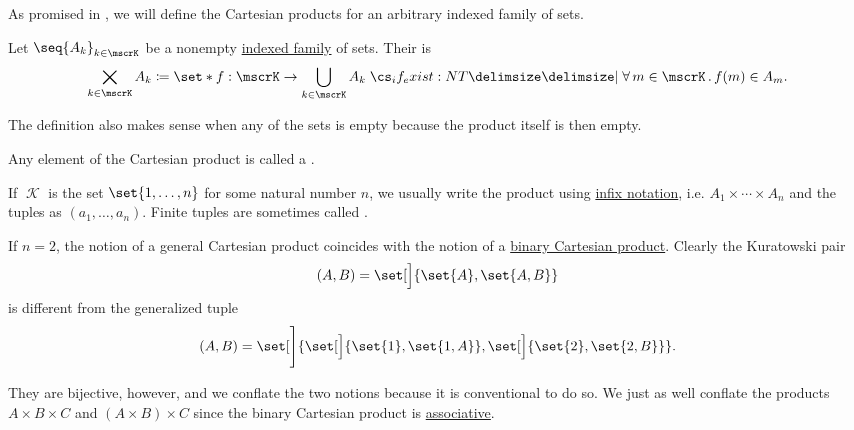 \begin{definition}\label{def:cartesian_product}
  As promised in , we will define the Cartesian products for an arbitrary indexed family of sets.

  Let \( \seq{ A_k }_{k \in \mscrK} \) be a nonempty \hyperref[def:indexed_family]{indexed family} of sets. Their  is
  \begin{equation}\label{eq:def:cartesian_product}
    \bigtimes_{k \in \mscrK} A_k \coloneqq \set*{ f: \mscrK \to \bigcup_{k \in \mscrK} A_k \given* \qforall{m \in \mscrK} f(m) \in A_m }.
  \end{equation}

  The definition also makes sense when any of the sets is empty because the product itself is then empty.

  Any element of the Cartesian product is called a .

  If \( \mscrK \) is the set \( \set{ 1, \ldots, n } \) for some natural number \( n \), we usually write the product using \hyperref[rem:first_order_formula_conventions/infix]{infix notation}, i.e. \( A_1 \times \cdots \times A_n \) and the tuples as \( (a_1, \ldots, a_n) \). Finite tuples are sometimes called .

  If \( n = 2 \), the notion of a general Cartesian product coincides with the notion of a \hyperref[def:binary_cartesian_product]{binary Cartesian product}. Clearly the Kuratowski pair
  \begin{equation*}
    (A, B) = \set[\Big]{ \set{ A }, \set{ A, B } }
  \end{equation*}
  is different from the generalized tuple
  \begin{equation*}
    (A, B) = \set[\Bigg]{ \set[\Big]{ \set{ 1 }, \set{ 1, A } }, \set[\Big]{ \set{ 2 }, \set{ 2, B } } }.
  \end{equation*}

  They are bijective, however, and we conflate the two notions because it is conventional to do so. We just as well conflate the products \( A \times B \times C \) and \( (A \times B) \times C \) since the binary Cartesian product is \hyperref[def:magma/associative]{associative}.
\end{definition}

